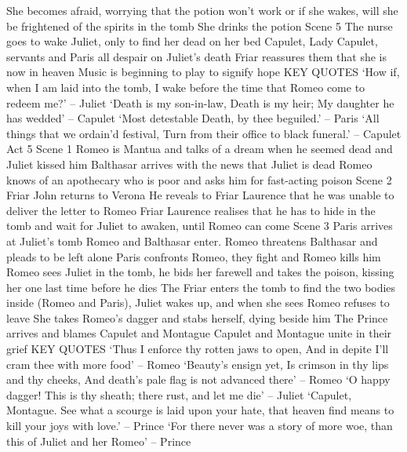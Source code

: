 \documentclass{article}
\begin{document}
\begin{outline}
\3 She becomes afraid, worrying that the potion won't work or if she wakes, will she be frightened of the spirits in the tomb
\3 She drinks the potion
\2 Scene 5
\3 The nurse goes to wake Juliet, only to find her dead on her bed
\3 Capulet, Lady Capulet, servants and Paris all despair on Juliet's death
\3 Friar reassures them that she is now in heaven
\3 Music is beginning to play to signify hope
\2 KEY QUOTES
\3 `How if, when I am laid into the tomb, I wake before the time that Romeo come to redeem me?' -- Juliet
\3 `Death is my son-in-law, Death is my heir; My daughter he has wedded' -- Capulet
\3 `Most detestable Death, by thee beguiled.' -- Paris
\3 `All things that we ordain'd festival, Turn from their office to black funeral.' -- Capulet
\1 Act 5
\2 Scene 1
\3 Romeo is Mantua and talks of a dream when he seemed dead and Juliet kissed him
\3 Balthasar arrives with the news that Juliet is dead
\3 Romeo knows of an apothecary who is poor and asks him for fast-acting poison
\2 Scene 2
\3 Friar John returns to Verona
\3 He reveals to Friar Laurence that he was unable to deliver the letter to Romeo
\3 Friar Laurence realises that he has to hide in the tomb and wait for Juliet to awaken, until Romeo can come
\2 Scene 3
\3 Paris arrives at Juliet's tomb
\3 Romeo and Balthasar enter. Romeo threatens Balthasar and pleads to be left alone
\3 Paris confronts Romeo, they fight and Romeo kills him
\3 Romeo sees Juliet in the tomb, he bids her farewell and takes the poison, kissing her one last time before he dies
\3 The Friar enters the tomb to find the two bodies inside (Romeo and Paris), Juliet wakes up, and when she sees Romeo refuses to leave
\3 She takes Romeo's dagger and stabs herself, dying beside him
\3 The Prince arrives and blames Capulet and Montague
\3 Capulet and Montague unite in their grief
\2 KEY QUOTES
\3 `Thus I enforce thy rotten jaws to open, And in depite I'll cram thee with more food' -- Romeo
\3 `Beauty's ensign yet, Is crimson in thy lips and thy cheeks, And death's pale flag is not advanced there' -- Romeo
\3 `O happy dagger! This is thy sheath; there rust, and let me die' -- Juliet
\3 `Capulet, Montague. See what a scourge is laid upon your hate, that heaven find means to kill your joys with love.' -- Prince
\3 `For there never was a story of more woe, than this of Juliet and her Romeo' -- Prince
\end{outline}
\end{document}
